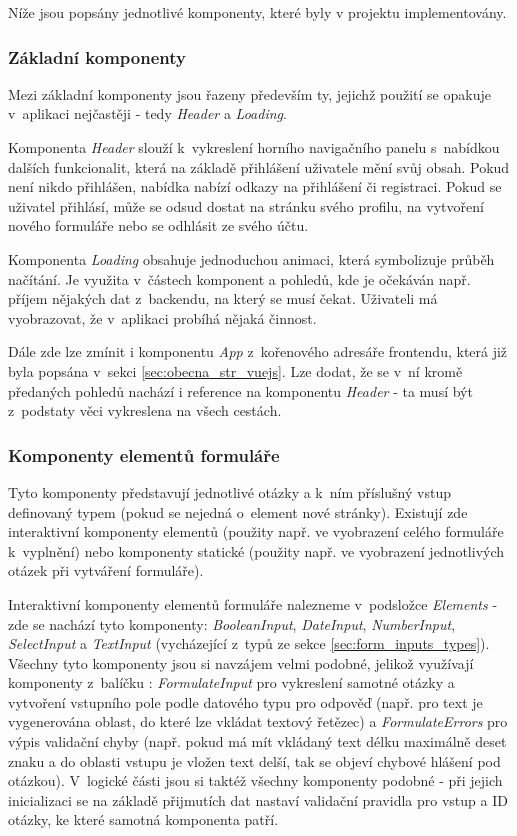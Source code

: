 	Níže jsou popsány jednotlivé komponenty, které byly v projektu implementovány.
		
		\subsubsection{Základní komponenty} \label{sec:komp_zakl} %
		Mezi základní komponenty jsou řazeny především ty, jejichž použití se opakuje v~aplikaci nejčastěji - tedy \textit{Header} a \textit{Loading}. 
		
		Komponenta \textit{Header} slouží k~vykreslení horního navigačního panelu s~nabídkou dalších funkcionalit, která na základě přihlášení uživatele mění svůj obsah. Pokud není nikdo přihlášen, nabídka nabízí odkazy na přihlášení či registraci. Pokud se uživatel přihlásí, může se odsud dostat na stránku svého profilu, na vytvoření nového formuláře nebo se odhlásit ze svého účtu.
		
		Komponenta \textit{Loading} obsahuje jednoduchou animaci, která symbolizuje průběh načítání. Je využita v~částech komponent a pohledů, kde je očekáván např. příjem nějakých dat z~backendu, na který se musí čekat. Uživateli má vyobrazovat, že v~aplikaci probíhá nějaká činnost.
		
		Dále zde lze zmínit i komponentu \textit{App} z~kořenového adresáře frontendu, která již byla popsána v~sekci \ref{sec:obecna_str_vuejs}. Lze dodat, že se v~ní kromě předaných pohledů nachází i reference na komponentu \textit{Header} - ta musí být z~podstaty věci vykreslena na všech cestách.
		
		\subsubsection{Komponenty elementů formuláře} \label{sec:komp_form} %
		Tyto komponenty představují jednotlivé otázky a k~ním příslušný vstup definovaný typem (pokud se nejedná o~element nové stránky). Existují zde interaktivní komponenty elementů (použity např. ve vyobrazení celého formuláře k~vyplnění) nebo komponenty statické (použity např. ve vyobrazení jednotlivých otázek při vytváření formuláře).
		
		Interaktivní komponenty elementů formuláře nalezneme v~podsložce \textit{Elements} - zde se nachází tyto komponenty: \textit{BooleanInput}, \textit{DateInput}, \textit{NumberInput}, \textit{SelectInput} a \textit{TextInput} (vycházející z~typů ze sekce \ref{sec:form_inputs_types}). Všechny tyto komponenty jsou si navzájem velmi podobné, jelikož využívají komponenty z~balíčku : \textit{FormulateInput} pro vykreslení samotné otázky a vytvoření vstupního pole podle datového typu pro odpověď (např. pro text je vygenerována oblast, do které lze vkládat textový řetězec) a \textit{FormulateErrors} pro výpis validační chyby (např. pokud má mít vkládaný text délku maximálně deset znaku a do oblasti vstupu je vložen text delší, tak se objeví chybové hlášení pod otázkou). V~logické části jsou si taktéž všechny komponenty podobné - při jejich inicializaci se na základě přijmutích dat nastaví validační pravidla pro vstup a ID otázky, ke které samotná komponenta patří.
		
